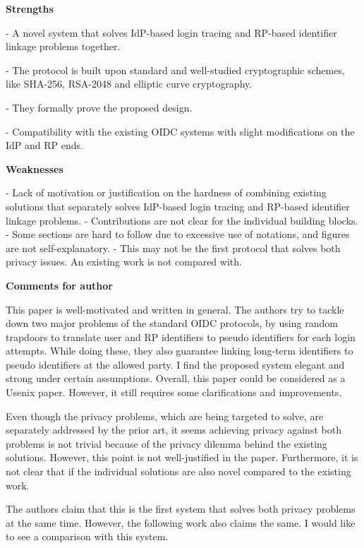 \documentclass[letterpaper,onecolumn,10pt]{article}
\begin{document}
\vspace{1mm}\noindent\textbf{Strengths}


-	A novel system that solves IdP-based login tracing and RP-based identifier linkage problems together.

-	The protocol is built upon standard and well-studied cryptographic schemes, like SHA-256, RSA-2048 and elliptic curve cryptography.

-	They formally prove the proposed design.

-	Compatibility with the existing OIDC systems with slight modifications on the IdP and RP ends.

\vspace{1mm}\noindent\textbf{Weaknesses}


-	Lack of motivation or justification on the hardness of combining existing solutions that separately solves IdP-based login tracing and RP-based identifier linkage problems.
-	Contributions are not clear for the individual building blocks.
-	Some sections are hard to follow due to excessive use of notations, and figures are not self-explanatory.
-	This may not be the first protocol that solves both privacy issues. An existing work is not compared with.

\vspace{1mm}\noindent\textbf{Comments for author}


This paper is well-motivated and written in general. The authors try to tackle down two major problems of the standard OIDC protocols, by using random trapdoors to translate user and RP identifiers to pseudo identifiers for each login attempts. While doing these, they also guarantee linking long-term identifiers to pseudo identifiers at the allowed party. I find the proposed system elegant and strong under certain assumptions. Overall, this paper could be considered as a Usenix paper. However, it still requires some clarifications and improvements.

Even though the privacy problems, which are being targeted to solve, are separately addressed by the prior art, it seems achieving privacy against both problems is not trivial because of the privacy dilemma behind the existing solutions. However, this point is not well-justified in the paper. Furthermore, it is not clear that if the individual solutions are also novel compared to the existing work.

The authors claim that this is the first system that solves both privacy problems at the same time. However, the following work also claims the same. I would like to see a comparison with this system.
\end{document}
